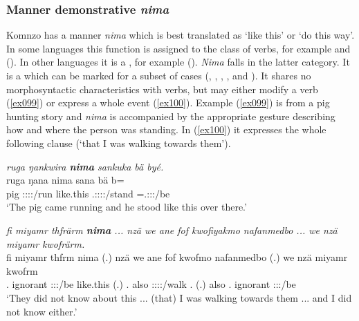 \subsubsection{Manner demonstrative \emph{nima}} \label{manner-den-adv-nima}

Komnzo has a manner  \emph{nima} which is best translated as `like this' or `do this way'. In some languages this function is assigned to the class of verbs, for example  and  (\citealt[72]{Dixon:2003dj}). In other languages it is a , for example  (\citealt[214]{Evans:1995uf}). \emph{Nima} falls in the latter category. It is a  which can be marked for a subset of cases (, , , , and ). It shares no morphosyntactic characteristics with verbs, but may either modify a verb (\ref{ex099}) or express a whole event (\ref{ex100}). Example (\ref{ex099}) is from a pig hunting story and \emph{nima} is accompanied by the appropriate gesture describing how and where the person was standing. In (\ref{ex100}) it expresses the whole following clause (`that I was walking towards them').

\begin{exe}
	\ex \emph{ruga ŋankwira \textbf{nima} sankuka bä byé.}\\
	\gll ruga ŋana nima sana bä b=\\
	pig \Stsg:\Sbj:\Pst:\Ipfv:\Venit/run {like.this} \Tsg{}.\Masc{}:\Sbj:\Pst:\Pfv:\Venit/stand \Med{} \Med{}=\Tsg{}.\Masc{}:\Sbj:\Nonpast:\Ipfv/be\\
	\trans `The pig came running and he stood like this over there.'\\ 
	\label{ex099}
\end{exe}
\begin{exe}
	\ex \emph{fi miyamr thfrärm \textbf{nima} ... nzä we ane fof kwofiyakmo nafanmedbo ... we nzä miyamr kwofrärm.}\\
	\gll fi miyamr thfrm nima (.) nzä we ane fof kwofmo nafanmedbo (.) we nzä miyamr kwofrm\\
	\Third{}.\Abs{} ignorant \Stpl:\Sbj:\Pst:\Dur/be {like.this} (.) \Fsg{}.\Abs{} also \Dem{} \Emph{} \Fsg:\Sbj:\Pst:\Dur:\Andat/walk \Third{}\Nsg{}.\All{} (.) also \Fsg{}.\Abs{} ignorant \Fsg:\Sbj:\Pst:\Dur/be\\
	\trans `They did not know about this ... (that) I was walking towards them ... and I did not know either.' 
	\label{ex100}
\end{exe}


